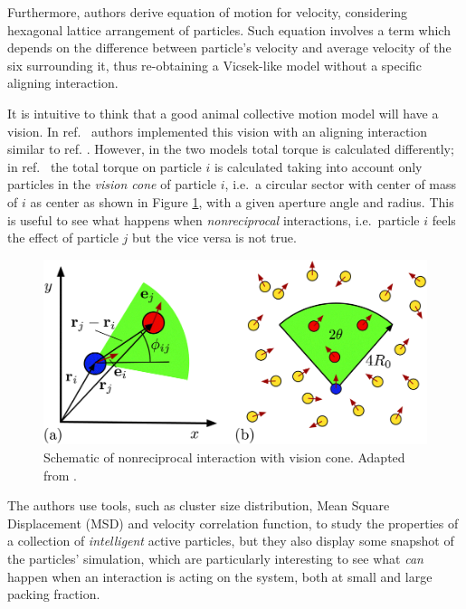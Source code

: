 \documentclass[../../master_thesis_np.tex]{subfiles}
\begin{document}
	Furthermore, authors derive equation of motion for velocity, considering hexagonal lattice arrangement of particles. 
	Such equation involves a term which depends on the difference between particle's velocity and average velocity of the six surrounding it, thus re-obtaining a Vicsek-like model without a specific aligning interaction.
	
	It is intuitive to think that a good animal collective motion model will have a vision. In ref.\ \cite{negi_emergent_2022} authors implemented this vision with an aligning interaction similar to ref. \cite{martin-gomez_collective_2018}.
    However, in the two models total torque is calculated differently; in ref.\ \cite{negi_emergent_2022} the total torque on particle $i$ is calculated taking into account only particles in the \emph{vision cone} of particle $i$, i.e.\ a circular sector with center of mass of $i$ as center as shown in Figure \ref{fig:negi_vision1}, with a given aperture angle and radius. 
	This is useful to see what happens when \emph{nonreciprocal} interactions, i.e.\ particle $i$ feels the effect of particle $j$ but the vice versa is not true.
	
	\begin{figure}[htp]
		\centering
		\includegraphics[width=\singfigwidth]{negi_vision1.png}
		\caption{Schematic of nonreciprocal interaction with vision cone. Adapted from \cite{negi_emergent_2022}.}
		\label{fig:negi_vision1}
	\end{figure}
	
	
	The authors use tools, such as cluster size distribution, Mean Square Displacement (MSD) and velocity correlation function, to study the properties of a collection of \emph{intelligent} active particles, but they also display some snapshot of the particles' simulation, which are particularly interesting to see what \emph{can} happen when an interaction is acting on the system, both at small and large packing fraction. 
	
\end{document}
